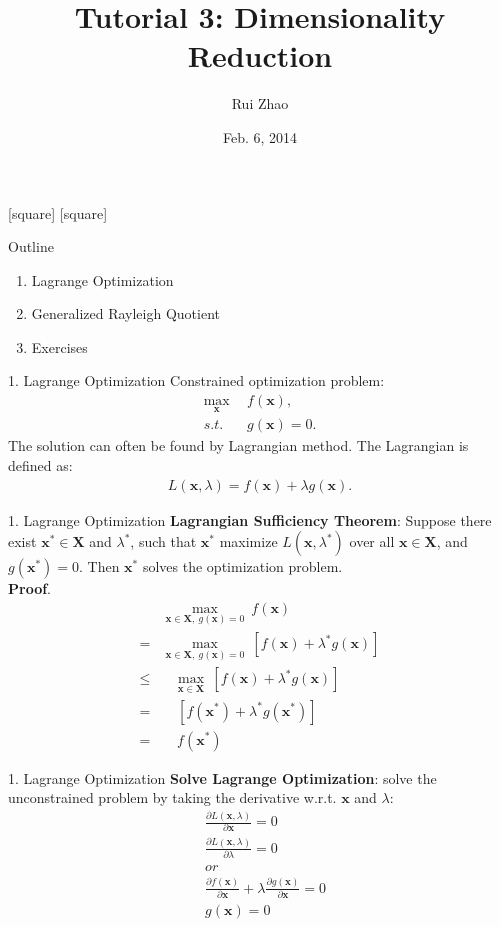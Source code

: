 \documentclass[compress,blue]{beamer}
\title[ENGG 5202 Pattern Recognition Tutorial 3]{Tutorial 3: Dimensionality Reduction}
\author{Rui Zhao}
\institute{rzhao@ee.cuhk.edu.hk}
\date{Feb. 6, 2014}
\newcommand{\bx}{\mathbf{x}}
\newcommand{\bX}{\mathbf{X}}
\begin{document}
\begin{frame}
\titlepage
\end{frame}

[square]
[square]

\begin{frame}{Outline}
	\begin{enumerate}
		\item<1-2> Lagrange Optimization
		\vspace{0.1in}
		\item<1> Generalized Rayleigh Quotient 
		\vspace{0.1in}
		\item<1> Exercises 
	\end{enumerate}
\end{frame}

\begin{frame}{1. Lagrange Optimization}
	Constrained optimization problem:
	\begin{align}
		\max_{\bx} ~&~ f(\bx), \\
		s.t. ~&~ g(\bx) = 0.
	\end{align}
	The solution can often be found by Lagrangian method. The Lagrangian is defined as:
	\begin{align}
		L(\bx, \lambda) = f(\bx) + \lambda g(\bx).
	\end{align}
\end{frame}

\begin{frame}{1. Lagrange Optimization}
	\textbf{Lagrangian Sufficiency Theorem}: Suppose there exist $\bx^* \in \bX$ and $\lambda^*$, such that $\bx^*$ maximize $L(\bx, \lambda^*)$ over all $\bx \in \bX$, and $g(\bx^*) = 0$. Then $\bx^*$ solves the optimization problem. \\
	\vspace{0.1in}
	\textbf{Proof}. 
	\begin{align}
		& \max_{\bx\in\bX, ~g(\bx) = 0} ~f(\bx)\\
		=& \max_{\bx\in\bX, ~g(\bx) = 0} ~[f(\bx) + \lambda^* g(\bx)] \\
		\leq &~~~~ \max_{\bx\in\bX} ~[f(\bx) + \lambda^* g(\bx)] \\
		= & ~~~~ ~[f(\bx^*) + \lambda^* g(\bx^*)] \\
		= & ~~~~ ~ f(\bx^*)
	\end{align} 
\end{frame}

\begin{frame}{1. Lagrange Optimization}
	\textbf{Solve Lagrange Optimization}: solve the unconstrained problem by taking the derivative w.r.t. $\bx$ and $\lambda$:
	\begin{align}
		&\frac{\partial L(\bx, \lambda)}{\partial \bx}  = 0 \\
		&\frac{\partial L(\bx, \lambda)}{\partial \lambda} = 0 \\
		&or \\
		&\frac{\partial f(\bx)}{\partial \bx} + \lambda\frac{\partial g(\bx)}{\partial \bx} = 0\\
		&g(\bx) = 0
	\end{align}
\end{frame}
\end{document}
